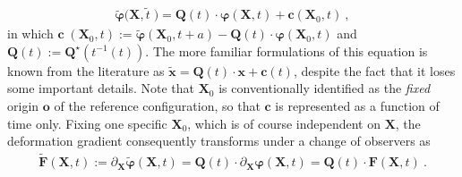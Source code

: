 \begin{align}
		\tilde{\boldsymbol{\varphi}}\big(\boldsymbol{X},\tilde{t}\;\!\big) = \boldsymbol{Q}(t)\cdot\boldsymbol{\varphi}(\boldsymbol{X},t) + \boldsymbol{c}(\boldsymbol{X}_{0},t) \ ,
\end{align}
in which $\boldsymbol{c}\;\!(\boldsymbol{X}_{0},t)\!:=\!\tilde{\boldsymbol{\varphi}}(\boldsymbol{X}_{0},t+a) - \boldsymbol{Q}(t)\cdot\boldsymbol{\varphi}(\boldsymbol{X}_{0},t)$ and $\boldsymbol{Q}(t)\!:=\!\boldsymbol{Q}^{\star}(t^{-1}(t))$. The more familiar formulations of this equation is known from the literature as $\tilde{\boldsymbol{x}}\!=\!\boldsymbol{Q}(t)\cdot\boldsymbol{x} + \boldsymbol{c}(t)$, despite the fact that it loses some important details. Note that $\boldsymbol{X}_{0}$ is conventionally identified as the \emph{fixed} origin $\boldsymbol{o}$ of the reference configuration, so that $\boldsymbol{c}$ is represented as a function of time only. Fixing one specific $\boldsymbol{X}_{0}$, which is of course independent on $\boldsymbol{X}$, the deformation gradient consequently transforms under a change of observers as
\begin{align}
	\tilde{\boldsymbol{F}}(\boldsymbol{X},t):=\partial_{\boldsymbol{X}}\tilde{\boldsymbol{\varphi}}(\boldsymbol{X},t) = \boldsymbol{Q}(t)\!\cdot\!\partial_{\boldsymbol{X}}\boldsymbol{\varphi}(\boldsymbol{X},t) = \boldsymbol{Q}(t)\!\cdot\!\boldsymbol{F}(\boldsymbol{X},t) \ .
\end{align}
